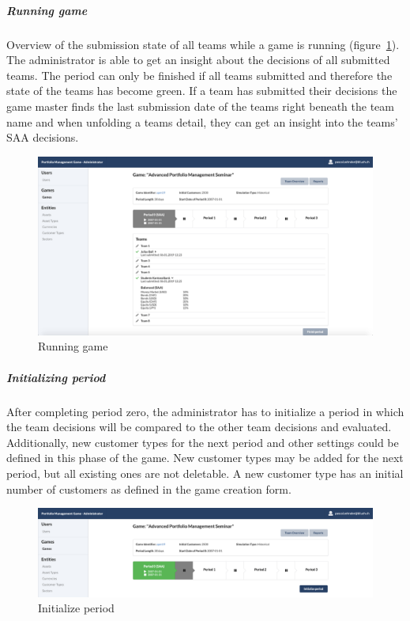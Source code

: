 \subparagraph{Running game}
Overview of the submission state of all teams while a game is running (figure~\ref{fig:running_game}). The administrator is able to get an insight about the decisions of all submitted teams. The period can only be finished if all teams submitted and therefore the state of the teams has become green. If a team has submitted their decisions the game master finds the last submission date of the teams right beneath the team name and when unfolding a teams detail, they can get an insight into the teams' SAA decisions.
\begin{figure}[h!]
  \centering
  \includegraphics[scale=0.2]{img/application-overview/administrator/07_running_game.png}
  \caption{Running game}
  \label{fig:running_game}
\end{figure}

\subparagraph{Initializing period}
After completing period zero, the administrator has to initialize a period in which the team decisions will be compared to the other team decisions and evaluated. Additionally, new customer types for the next period and other settings could be defined in this phase of the game. New customer types may be added for the next period, but all existing ones are not deletable. A new customer type has an initial number of customers as defined in the game creation form.
\begin{figure}[h!]
  \centering
  \includegraphics[scale=0.2]{img/application-overview/administrator/08_period_initialization.png}
  \caption{Initialize period}
\end{figure}


